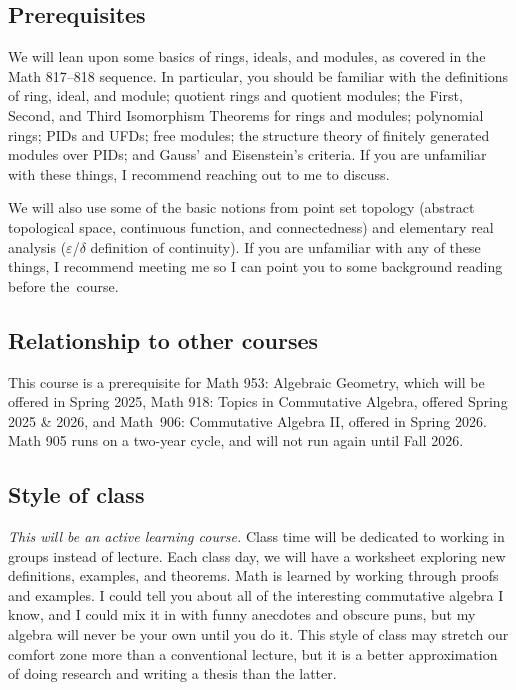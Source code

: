 \documentclass[12pt]{amsart}
\begin{document}
	\subsection*{Prerequisites} We will lean upon some basics of rings, ideals, and modules, as covered in the Math 817--818 sequence. In particular, you should be familiar with the definitions of ring, ideal, and module; quotient rings and quotient modules; the First, Second, and Third Isomorphism Theorems for rings and modules; polynomial rings; PIDs and UFDs; free modules; the structure theory of finitely generated modules over PIDs; and Gauss' and Eisenstein's criteria. If you are unfamiliar with these things, I recommend reaching out to me to discuss.
	
	We will also use some of the basic notions from point set topology (abstract topological space, continuous function, and connectedness) and elementary real analysis ($\varepsilon$/$\delta$ definition of continuity). If you are unfamiliar with any of these things, I recommend meeting me so I can point you to some background reading before the~course.
	

	
	\subsection*{Relationship to other courses} This course is a prerequisite for Math 953: Algebraic Geometry, which will be offered in Spring 2025, Math 918: Topics in Commutative Algebra, offered Spring 2025 \& 2026, and Math~906: Commutative Algebra II, offered in Spring 2026. Math 905 runs on a two-year cycle, and will not run again until Fall 2026.
	
	\subsection*{Style of class} \emph{This will be an active learning course.} Class time will be dedicated to working in groups instead of lecture. Each class day, we will have a worksheet exploring new definitions, examples, and theorems. Math is learned by working through proofs and examples. I could tell you about all of the interesting commutative algebra I know, and I could mix it in with funny anecdotes and obscure puns, but my algebra will never be your own until you do it. This style of class may stretch our comfort zone more than a conventional lecture, but it is a better approximation of doing research and writing a thesis than the latter.
			
\end{document}
